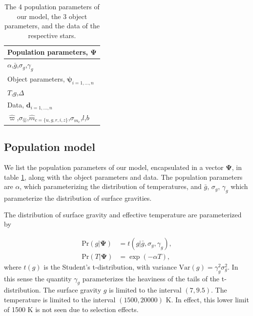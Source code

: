 \documentclass[fleqn,usenatbib]{mnras}
\newcommand{\popp}{\boldsymbol{\Psi}}
\newcommand{\objp}{\boldsymbol{\psi}}
\newcommand{\data}{\mathbf{d}}
\newcommand{\Teff}{T}
\newcommand{\logg}{g}
\newcommand{\pr}{\text{Pr}}
\begin{document}
\begin{table}
	\centering
	\caption{The 4 population parameters of our model, the 3 object parameters, and the data of the respective stars.}
	\label{tab:parameters}
    \begin{tabular}{l}
		\hline
		Population parameters, $\popp$ \\
		\hline
		$\alpha$,\quad $\bar{g}$,\quad $\sigma_g$,\quad $\gamma_g$ \\
        \hline
        Object parameters, $\objp_{i=1,...,n}$ \\
        \hline
        $\Teff$,\quad $\logg$,\quad $\Delta$ \\
        \hline
        Data, $\data_{i=1,...,n}$ \\
        \hline
        $\hat{\varpi}$,\quad $\sigma_{\hat{\varpi}}$,\quad $\hat{m}_{c=\{u,g,r,i,z\}}$,\quad $\sigma_{\hat{m}_c}$,\quad $l$,\quad $b$ \\
		\hline
	\end{tabular}
\end{table}

\subsection{Population model}\label{sec:populationmodel}

We list the population parameters of our model, encapsulated in a vector $\popp$, in table \ref{tab:parameters}, along with the object parameters and data. The population parameters are $\alpha$, which parameterizing the distribution of temperatures, and $\bar{g}$, $\sigma_g$, $\gamma_g$ which parameterize the distribution of surface gravities.

The distribution of surface gravity and effective temperature are parameterized by

\begin{equation}
\begin{split}
	\pr(\logg | \popp) & = t(\logg|\bar{g},\sigma_g,\gamma_g),\\
    \pr(\Teff | \popp) & = \exp (-\alpha \Teff),
\end{split}
\end{equation}
where $t(\logg)$ is the Student's t-distribution, with variance $\text{Var}(g) = \gamma_g^2 \sigma_g^2$. In this sense the quantity $\gamma_g$ parameterizes the heaviness of the tails of the t-distribution. The surface gravity $\logg$ is limited to the interval $(7,9.5)$. The temperature is limited to the interval $(1500,20000)$ K. In effect, this lower limit of 1500 K is not seen due to selection effects.
\end{document}
